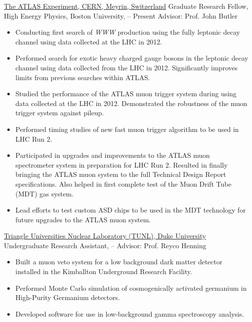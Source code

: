 \href{http://www.atlas.ch}{{The ATLAS Experiment}, CERN, Meyrin, Switzerland} \newline
Graduate Research Fellow, High Energy Physics, Boston University,  -- Present \newline
Advisor: Prof. John Butler
{\begin{itemize}
\item Conducting first search of \textit{WWW} production using the fully leptonic decay channel using data collected at the LHC in 2012.
\item Performed search for exotic heavy charged gauge bosons in the leptonic decay channel using data collected from the LHC in 2012. Significantly improves limits from previous searches within ATLAS.
\item Studied the performance of the ATLAS muon trigger system during 
using data collected at the LHC in 2012.  Demonstrated the robustness of the muon trigger system against pileup.
\item Performed timing studies of new fast muon trigger algorithm to 
be used in LHC Run 2.
\item Participated in upgrades and improvements to the ATLAS muon spectrometer system in preparation for LHC Run 2.  Resulted in finally 
bringing the ATLAS muon system to the full Technical Design Report specifications. Also helped in first complete test of the Muon Drift Tube (MDT) gas system.
\item Lead efforts to test custom ASD chips to be used in the MDT 
technology for future upgrades to the ATLAS muon system.
\end{itemize}
}

\href{http://www.tunl.duke.edu}{{Triangle Universities Nuclear Laboratory (TUNL)}, Duke University} \newline
Undergraduate Research Assistant,  --  \newline
Advisor: Prof. Reyco Henning 
{\begin{itemize}
\item Built a muon veto system for a low background dark matter detector installed in the Kimballton Underground Research Facility.
\item Performed Monte Carlo simulation of cosmogenically activated germanium in High-Purity Germanium detectors.
\item Developed software for use in low-background gamma spectroscopy analysis.
\end{itemize}
}


